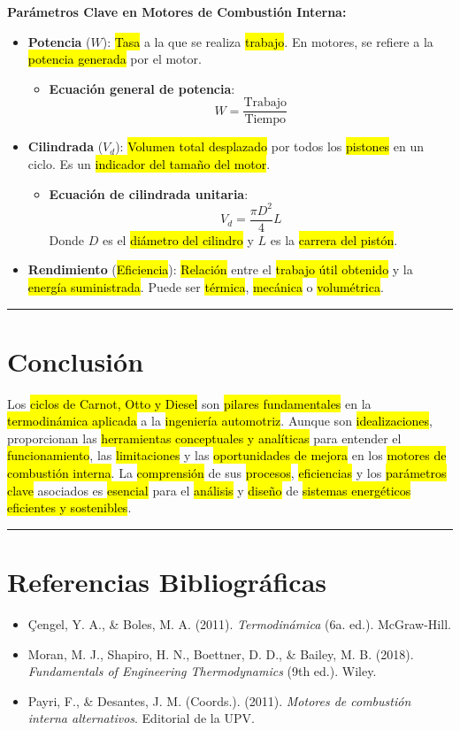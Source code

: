\documentclass{article}
\begin{document}
\textbf{Parámetros Clave en Motores de Combustión Interna:}

\begin{itemize}
    \item \textbf{Potencia} ($W$): \hl{Tasa} a la que se realiza \hl{trabajo}. En motores, se refiere a la \hl{potencia generada} por el motor.
    \begin{itemize}
        \item \textbf{Ecuación general de potencia}:
        $$
        W = \frac{\text{Trabajo}}{\text{Tiempo}}
        $$
    \end{itemize}
    \item \textbf{Cilindrada} ($V_d$): \hl{Volumen total desplazado} por todos los \hl{pistones} en un ciclo. Es un \hl{indicador del tamaño del motor}.
    \begin{itemize}
        \item \textbf{Ecuación de cilindrada unitaria}:
        $$
        V_d = \frac{\pi D^2}{4} L
        $$
        Donde $D$ es el \hl{diámetro del cilindro} y $L$ es la \hl{carrera del pistón}.
    \end{itemize}
    \item \textbf{Rendimiento} (\hl{Eficiencia}): \hl{Relación} entre el \hl{trabajo útil obtenido} y la \hl{energía suministrada}. Puede ser \hl{térmica}, \hl{mecánica} o \hl{volumétrica}.
\end{itemize}


\hrule

\section*{Conclusión}

Los \hl{ciclos de Carnot, Otto y Diesel} son \hl{pilares fundamentales} en la \hl{termodinámica aplicada} a la \hl{ingeniería automotriz}. Aunque son \hl{idealizaciones}, proporcionan las \hl{herramientas conceptuales y analíticas} para entender el \hl{funcionamiento}, las \hl{limitaciones} y las \hl{oportunidades de mejora} en los \hl{motores de combustión interna}. La \hl{comprensión} de sus \hl{procesos}, \hl{eficiencias} y los \hl{parámetros clave} asociados es \hl{esencial} para el \hl{análisis} y \hl{diseño} de \hl{sistemas energéticos eficientes y sostenibles}.

\hrule

\section*{Referencias Bibliográficas}

\begin{itemize}
    \item Çengel, Y. A., \& Boles, M. A. (2011). \textit{Termodinámica} (6a. ed.). McGraw-Hill.
    \item Moran, M. J., Shapiro, H. N., Boettner, D. D., \& Bailey, M. B. (2018). \textit{Fundamentals of Engineering Thermodynamics} (9th ed.). Wiley.
    \item Payri, F., \& Desantes, J. M. (Coords.). (2011). \textit{Motores de combustión interna alternativos}. Editorial de la UPV.
\end{itemize}
\end{document}
